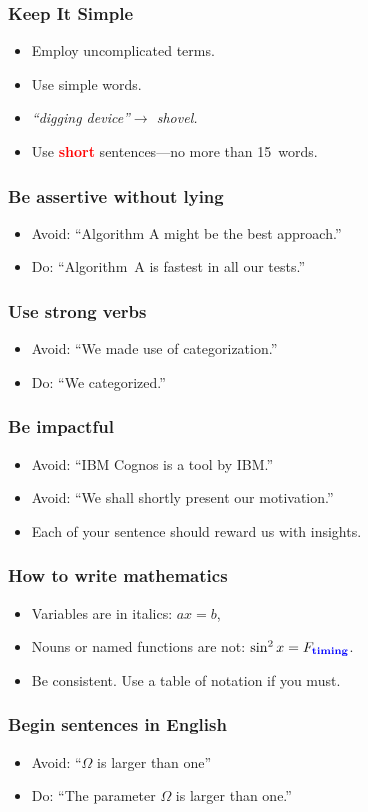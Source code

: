 \documentclass[handout]{beamer}
\newcommand{\vimportant}[1]{\textcolor{red}{\textbf{#1}}}
\newcommand{\important}[1]{\textcolor{blue}{\textbf{#1}}}
\begin{document}
\frame
{
  \frametitle{Keep It Simple}
  \begin{itemize}
  \item<1->  Employ uncomplicated terms.
  \item<2->  Use simple words.
  \item<3-> \emph{``digging device''$\to$  shovel.}
    \item<4->  Use \vimportant{short} sentences---no more than 15~words.
 \end{itemize}
 }


\frame
{
  \frametitle{Be assertive without lying}
  \begin{itemize}
  \item<1-> Avoid: ``Algorithm A might be the best approach.''
  \item<2-> Do: ``Algorithm~A is fastest in all our tests.''
 \end{itemize}
 }

\frame
{
  \frametitle{Use strong verbs}
  \begin{itemize}
  \item<1-> Avoid: ``We made use of categorization.''
  \item<2-> Do: ``We categorized.''
 \end{itemize}
 }

\frame
{
  \frametitle{Be impactful}
  \begin{itemize}
  \item<1-> Avoid: ``IBM Cognos is a tool by IBM.''
  \item<2-> Avoid: ``We shall shortly present our motivation.''
  \item<3-> Each of your sentence should reward us with insights.

 \end{itemize}
 }



\frame
{
  \frametitle{How to write mathematics}
  \begin{itemize}
  \item<1->  Variables are in italics: $a x = b$,
  \item<2-> Nouns or named functions are not: $\sin^2 x = F_{\textrm{\important{timing}}}$.
  \item<3->  Be consistent. Use a table of notation if you must.
  \end{itemize}
}

\frame
{
  \frametitle{Begin sentences in English}
  \begin{itemize}
  \item<1->  Avoid: ``$\Omega$ is larger than one''
  \item<2->  Do: ``The parameter $\Omega$ is larger than one.''
    \end{itemize}
}
\end{document}
